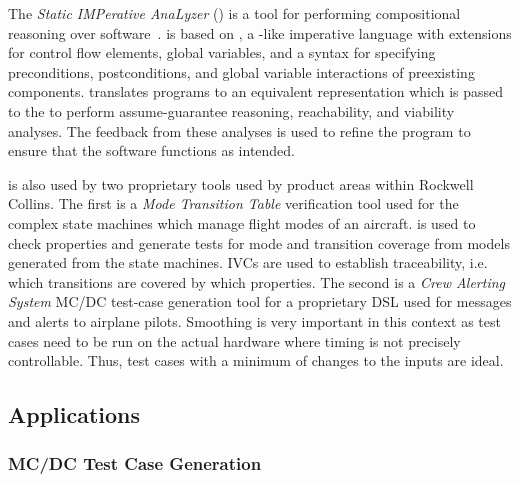 The {\em Static IMPerative AnaLyzer} (\simpal) is a tool for
performing compositional reasoning over
software~\cite{wagner2017spin}. \simpal is based on \limp, a \lustre-like imperative language with extensions for control flow elements, global variables, and a syntax for specifying preconditions, postconditions, and global variable interactions of
preexisting components. \simpal translates \limp programs to an
equivalent \lustre representation which is passed to the \jkind to
perform assume-guarantee reasoning, reachability, and viability
analyses. The feedback from these analyses is used to refine the
program to ensure that the software functions as intended.

\jkind is also used by two proprietary tools used by product areas within Rockwell Collins.  The first is a {\em Mode Transition Table} verification tool used for the complex state machines which manage flight modes of an aircraft.
\jkind is used to check properties and generate tests for mode and transition coverage from \lustre models generated from the state machines.
IVCs are used to establish traceability, i.e. which transitions are covered by which properties.  The second is a {\em Crew Alerting System} MC/DC test-case generation tool for a proprietary DSL used for messages and alerts to airplane pilots.  Smoothing is very important in this context as test cases need to be run on the actual hardware where
timing is not precisely controllable. Thus, test cases with a minimum
of changes to the inputs are ideal.
%
%

\subsection{Applications}

\subsubsection{MC/DC Test Case Generation}

